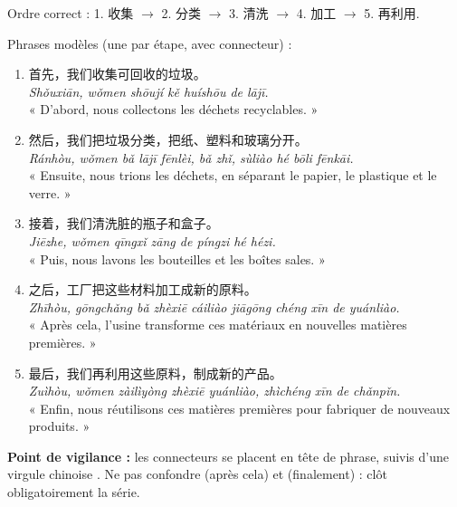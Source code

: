 \documentclass[11pt]{article}
\newcommand{\zh}[1]{\ifmmode\text{#1}\else{#1}\fi}
\begin{document}
\begin{corrige}
Ordre correct : 1. 收集 $\to$ 2. 分类 $\to$ 3. 清洗 $\to$ 4. 加工 $\to$ 5. 再利用.

Phrases modèles (une par étape, avec connecteur) :
\begin{enumerate}
    \item 首先，我们收集可回收的垃圾。\\ \emph{Shǒuxiān, wǒmen shōují kě huíshōu de lājī.}\\ « D'abord, nous collectons les déchets recyclables. »
    \item 然后，我们把垃圾分类，把纸、塑料和玻璃分开。\\ \emph{Ránhòu, wǒmen bǎ lājī fēnlèi, bǎ zhǐ, sùliào hé bōli fēnkāi.}\\ « Ensuite, nous trions les déchets, en séparant le papier, le plastique et le verre. »
    \item 接着，我们清洗脏的瓶子和盒子。\\ \emph{Jiēzhe, wǒmen qīngxǐ zāng de píngzi hé hézi.}\\ « Puis, nous lavons les bouteilles et les boîtes sales. »
    \item 之后，工厂把这些材料加工成新的原料。\\ \emph{Zhīhòu, gōngchǎng bǎ zhèxiē cáiliào jiāgōng chéng xīn de yuánliào.}\\ « Après cela, l'usine transforme ces matériaux en nouvelles matières premières. »
    \item 最后，我们再利用这些原料，制成新的产品。\\ \emph{Zuìhòu, wǒmen zàilìyòng zhèxiē yuánliào, zhìchéng xīn de chǎnpǐn.}\\ « Enfin, nous réutilisons ces matières premières pour fabriquer de nouveaux produits. »
\end{enumerate}
\textbf{Point de vigilance :} les connecteurs se placent en tête de phrase, suivis d'une virgule chinoise \zh{，}. Ne pas confondre \zh{之后} (après cela) et \zh{最后} (finalement) : \zh{最后} clôt obligatoirement la série.
\end{corrige}
\end{document}
